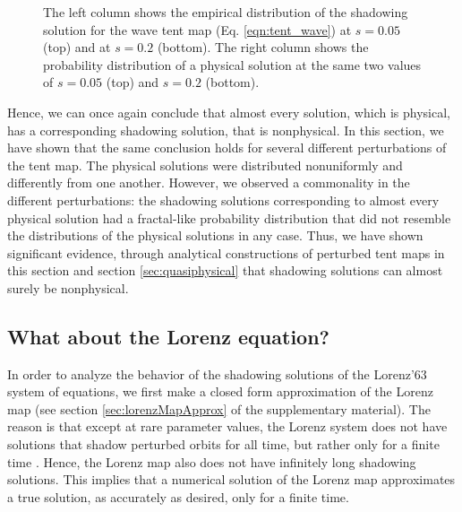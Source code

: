 \begin{figure}
    \caption{The left column shows the empirical distribution of the shadowing solution for the wave tent map (Eq. \ref{eqn:tent_wave}) at $s=0.05$ (top) and at $s=0.2$ (bottom). The right column shows the probability distribution of a physical solution at the same two values of $s = 0.05$ (top) and $s = 0.2$ (bottom).}
    \label{fig:tent_wave_shadow}
\end{figure}
Hence, we can once again conclude that almost every solution, which is physical, 
has a corresponding shadowing solution, that is nonphysical. In this section,
we have shown that the same conclusion holds for several different perturbations 
of the tent map. The physical solutions were distributed nonuniformly 
and differently from one another. However, we observed a commonality in the different perturbations: the shadowing solutions corresponding to almost every physical solution had a fractal-like probability distribution that did not resemble the distributions of the physical solutions in any case. Thus, we have shown significant evidence, through analytical constructions of perturbed tent maps in this section and 
section \ref{sec:quasiphysical} that shadowing solutions can almost surely be nonphysical.

\subsection{What about the Lorenz equation?}
In order to analyze the behavior of the shadowing solutions of the Lorenz'63 system 
of equations, we first make a closed form approximation of the Lorenz map (see section \ref{sec:lorenzMapApprox} of the supplementary material). The reason 
is that except at rare parameter values, the Lorenz system does not have 
solutions that shadow perturbed orbits for all time, but rather only for a finite time 
\cite{lorenzPOTP}. Hence, the Lorenz map also does not have infinitely long shadowing solutions. This implies that a numerical solution of the Lorenz map approximates 
a true solution, as accurately as desired, only for a finite time.

